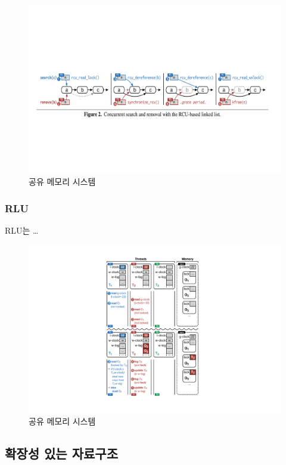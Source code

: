 \begin{figure}[h!]
    \centering
    \includegraphics[width=1\textwidth]{fig/rcu/rcu_list}
    \caption{공유 메모리 시스템}
  \label{shared_memory}
\end{figure}

\subsubsection{RLU}

RLU는 \ldots


\begin{figure}[h!]
    \centering
    \includegraphics[width=1\textwidth]{fig/rlu/rlu_principle}
    \caption{공유 메모리 시스템}
  \label{shared_memory}
\end{figure}




\subsection{확장성 있는 자료구조}

